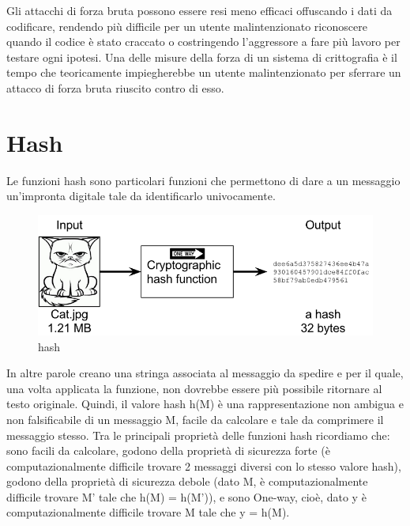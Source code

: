 Gli attacchi di forza bruta possono essere resi meno efficaci offuscando i dati da codificare, rendendo più difficile per un utente malintenzionato riconoscere quando il codice è stato craccato o costringendo l'aggressore a fare più lavoro per testare ogni ipotesi. Una delle misure della forza di un sistema di crittografia è il tempo che teoricamente impiegherebbe un utente malintenzionato per sferrare un attacco di forza bruta riuscito contro di esso.
\section{Hash}
Le funzioni hash \cite{hash} sono particolari funzioni che permettono di dare a un messaggio un’impronta digitale tale da identificarlo univocamente.
\begin{figure}[h]
    \centering
    \includegraphics[width=115mm]{Immagini/introduzione/hash.png}
    \caption{hash}
    \label{fig:hash}
\end{figure}

In altre parole creano una stringa associata al messaggio da spedire e per il quale, una volta applicata la funzione, non dovrebbe essere più possibile ritornare al testo originale.
Quindi, il valore hash h(M) è una rappresentazione non ambigua e non falsificabile di un messaggio M, facile da calcolare e tale da comprimere il messaggio stesso.
Tra le principali proprietà delle funzioni hash ricordiamo che: sono facili da calcolare, godono della proprietà di sicurezza forte (è computazionalmente difficile trovare 2 messaggi diversi con lo stesso valore hash), godono della proprietà di sicurezza debole (dato M, è computazionalmente difficile trovare M’ tale che h(M) = h(M’)), e sono One-way, cioè, dato y è computazionalmente difficile trovare M tale che y = h(M).
